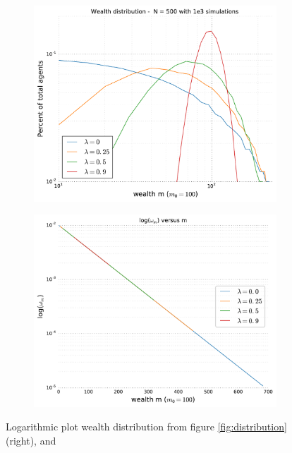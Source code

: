 \documentclass[10pt, a4paper]{amsart}
\begin{document}
\begin{figure}
\begin{subfigure}{.5\textwidth}
  \centering
  \includegraphics[width=\textwidth]{../figures/5ac/5cLOGLOG_N500_varSavings.pdf}
  \caption{}
  \label{fig:logdistribution}
\end{subfigure}%
\begin{subfigure}{.5\textwidth}
  \centering
  \includegraphics[width=\linewidth]{../figures/5ac/omega.pdf}
  \caption{}
  \label{fig:straightline}
\end{subfigure}
\caption{Logarithmic plot wealth distribution from figure \ref{fig:distribution} (right), and }
\label{fig:logplot}
\end{figure}
\end{document}
